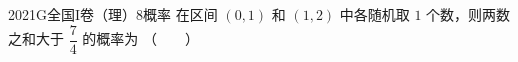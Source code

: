 
\begin{problem}{2021}{G}{全国I卷（理）}{8}{概率}
在区间 $ (0,1) $ 和 $ (1,2) $ 中各随机取 $ 1 $ 个数，则两数之和大于 $ \dfrac{7}{4} $ 的概率为 \hspace{1cm}（　　）
\begin{choices}
\end{choices}
\end{problem}

\begin{answer}

\end{answer}

\begin{solutions}

\end{solutions}